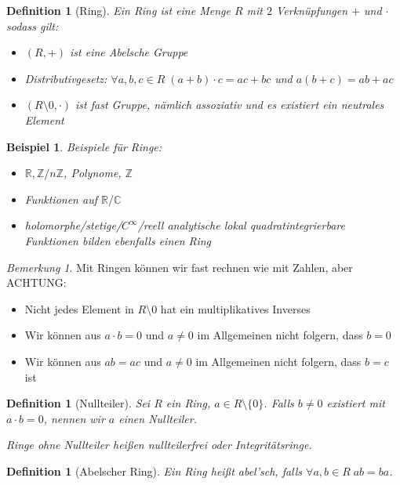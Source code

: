 \documentclass[a4paper,12pt,numbers=noenddot,parskip=full]{scrartcl}
\newcommand{\setZ}{\mathbb{Z}}
\newcommand{\setR}{\mathbb{R}}
\newcommand{\setC}{\mathbb{C}}
\theoremstyle{dotless}
\newtheorem{definition}[theorem]{Definition}
\newtheorem{example}[theorem]{Beispiel}
\theoremstyle{remark}
\newtheorem*{remark}{Bemerkung}
\begin{document}
	\begin{definition}[Ring]
		Ein Ring ist eine Menge $R$ mit $2$ Verknüpfungen $+$ und $\cdot$ sodass gilt:
		\begin{itemize}
			\item $(R,+)$ ist eine Abelsche Gruppe
			\item Distributivgesetz: $\forall a,b,c \in R \; (a+b) \cdot c = ac + bc$ und $a(b+c) = ab + ac$
			\item $(R \setminus 0, \cdot)$ ist fast Gruppe, nämlich assoziativ und es existiert ein neutrales Element
		\end{itemize}
	\end{definition}

	\begin{example}
		Beispiele für Ringe:
		\begin{itemize}
			\item $\setR, \setZ / n\setZ$, Polynome, $\setZ$
			\item Funktionen auf $\setR / \setC$
			\item holomorphe/stetige/$C^\infty$/reell analytische lokal quadratintegrierbare Funktionen bilden ebenfalls einen Ring
		\end{itemize}
	\end{example}

	\begin{remark}
		Mit Ringen können wir fast rechnen wie mit Zahlen, aber \uppercase{Achtung}:
		\begin{itemize}
			\item Nicht jedes Element in $R \setminus 0$ hat ein multiplikatives Inverses
			\item Wir können aus $a \cdot b = 0$ und $a \neq 0$ im Allgemeinen nicht folgern, dass $b = 0$
			\item Wir können aus $ab = ac$ und $a \neq 0$ im Allgemeinen nicht folgern, dass $b = c$ ist
		\end{itemize}
	\end{remark}

	\begin{definition}[Nullteiler]
		Sei $R$ ein Ring, $a \in R \setminus \{0\}$. Falls $b \neq 0$ existiert mit $a \cdot b = 0$, nennen wir $a$ einen Nullteiler.
		
		Ringe ohne Nullteiler heißen nullteilerfrei oder Integritätsringe.
	\end{definition}

	\begin{definition}[Abelscher Ring]
		Ein Ring heißt abel'sch, falls $\forall a,b \in R \; ab = ba$.
	\end{definition}
\end{document}
